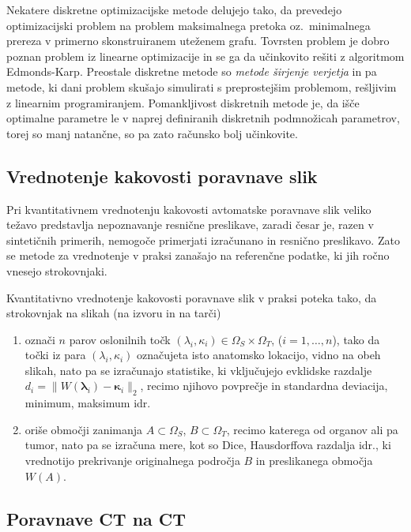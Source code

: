 \documentclass[journal]{IEEEtran}
\begin{document}
Nekatere diskretne optimizacijske metode delujejo tako, da prevedejo optimizacijski problem na problem maksimalnega pretoka oz.~minimalnega prereza v primerno skonstruiranem uteženem grafu. Tovrsten problem je dobro poznan problem iz linearne optimizacije in se ga da učinkovito rešiti z algoritmom Edmonds-Karp. Preostale diskretne metode so \emph{metode širjenje verjetja} in pa metode, ki dani problem skušajo simulirati s preprostejšim problemom, rešljivim z linearnim programiranjem. Pomankljivost diskretnih metode je, da išče optimalne parametre le v naprej definiranih diskretnih podmnožicah parametrov, torej so manj natančne, so pa zato računsko bolj učinkovite.


\subsection{Vrednotenje kakovosti poravnave slik}

Pri kvantitativnem vrednotenju kakovosti avtomatske poravnave slik veliko težavo predstavlja nepoznavanje resnične preslikave, zaradi česar je, razen v sintetičnih primerih, nemogoče primerjati izračunano in resnično preslikavo. Zato se metode za vrednotenje v praksi zanašajo na referenčne podatke, ki jih ročno vnesejo strokovnjaki.

Kvantitativno vrednotenje kakovosti poravnave slik v praksi poteka tako, da strokovnjak na slikah (na izvoru in na tarči)
\begin{enumerate}
\item označi $n$ parov oslonilnih točk $(\lambda_i,\kappa_i)\in\Omega_S\times\Omega_T$, ($i=1,\dots,n$), tako da točki iz para $(\lambda_i, \kappa_i)$ označujeta isto anatomsko lokacijo, vidno na obeh slikah, nato pa se izračunajo statistike, ki vključujejo evklidske razdalje $d_i=\|W(\boldsymbol{\lambda}_i)-\boldsymbol{\kappa}_i\|_2$, recimo njihovo povprečje in standardna deviacija, minimum, maksimum idr.
\item oriše območji zanimanja $A\subset\Omega_S$, $B\subset\Omega_T$, recimo katerega od organov ali pa tumor, nato pa se izračuna mere, kot so Dice, Hausdorffova razdalja idr., ki vrednotijo prekrivanje originalnega področja $B$ in preslikanega območja $W(A)$.
\end{enumerate}

\subsection{Poravnave CT na CT}
\end{document}
